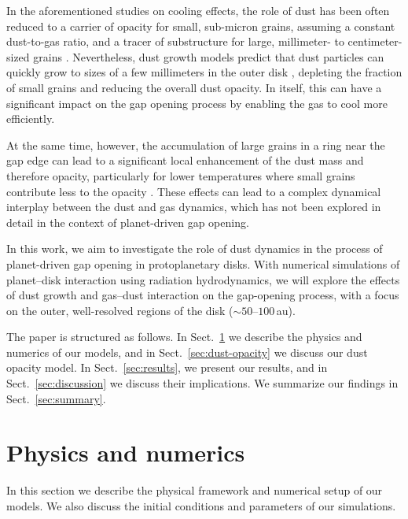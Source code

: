 \documentclass[fleqn,usenatbib,useAMS]{mnras}
\begin{document}
In the aforementioned studies on cooling effects, the role of dust has been often reduced to a carrier of opacity for small, sub-micron grains, assuming a constant dust-to-gas ratio, and a tracer of substructure for large, millimeter- to centimeter-sized grains \citep[e.g.,][]{weber-etal-2019,binkert-etal-2023}. Nevertheless, dust growth models predict that dust particles can quickly grow to sizes of a few millimeters in the outer disk \citep{birnstiel-etal-2012,stammler-birnstiel-2022,birnstiel-2023,dominik-dullemond-2024}, depleting the fraction of small grains and reducing the overall dust opacity. In itself, this can have a significant impact on the gap opening process by enabling the gas to cool more efficiently.

At the same time, however, the accumulation of large grains in a ring near the gap edge can lead to a significant local enhancement of the dust mass and therefore opacity, particularly for lower temperatures where small grains contribute less to the opacity \citep[$\kappa_\text{small}\propto T^{1.5\text{--}2}$, see e.g.,][]{semenov-etal-2003,birnstiel-etal-2018}. These effects can lead to a complex dynamical interplay between the dust and gas dynamics, which has not been explored in detail in the context of planet-driven gap opening.

In this work, we aim to investigate the role of dust dynamics in the process of planet-driven gap opening in protoplanetary disks. With numerical simulations of planet--disk interaction using radiation hydrodynamics, we will explore the effects of dust growth and gas--dust interaction on the gap-opening process, with a focus on the outer, well-resolved regions of the disk ($\sim$$50\text{--}100$\,au).

The paper is structured as follows. In Sect.~\ref{sec:physics-numerics} we describe the physics and numerics of our models, and in Sect.~\ref{sec:dust-opacity} we discuss our dust opacity model. In Sect.~\ref{sec:results}, we present our results, and in Sect.~\ref{sec:discussion} we discuss their implications. We summarize our findings in Sect.~\ref{sec:summary}.

\section{Physics and numerics}
\label{sec:physics-numerics}

In this section we describe the physical framework and numerical setup of our models. We also discuss the initial conditions and parameters of our simulations.
\end{document}
